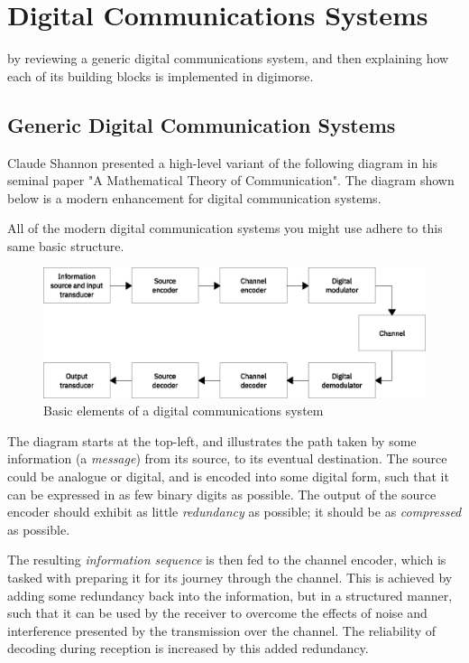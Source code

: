 \documentclass[a4paper]{tufte-handout}
\begin{document}
\pagebreak
\section{Digital Communications Systems}
 by reviewing a generic
    digital communications system, and then explaining how each of its building
    blocks is implemented in digimorse.

\subsection{Generic Digital Communication Systems}
    Claude Shannon presented a high-level variant of the following diagram in his seminal paper "A Mathematical
    Theory of Communication"\cite{Shannon1948}. The diagram shown below is a modern enhancement for digital
    communication systems.

    All of the modern digital communication systems you might use adhere to this same basic structure.

    \begin{figure}[h]
        \includegraphics[width=\linewidth]{digital-communication-system}
        \caption{Basic elements of a digital communications system}
        \label{fig:digcomms}
    \end{figure}


    The diagram starts at the top-left, and illustrates the path taken by some information (a \emph{message}) from
    its source, to its eventual destination.
    The source could be analogue or digital, and is encoded into some digital form, such that it can be expressed in
    as few binary digits as possible.
    The output of the source encoder should exhibit as little \emph{redundancy} as possible; it should be as
    \emph{compressed} as possible.

    The resulting \emph{information sequence} is then fed to the channel encoder, which is tasked with preparing it
    for its journey through the channel.
    This is achieved by adding some redundancy back into the information, but in a structured manner, such that it
    can be used by the receiver to overcome the effects of noise and interference presented by the transmission over
    the channel.
    The reliability of decoding during reception is increased by this added redundancy.
\end{document}
